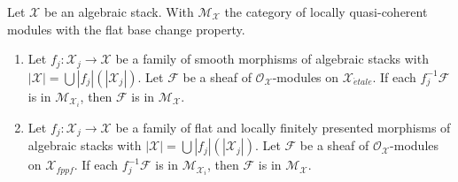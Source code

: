 \begin{lemma}
\label{lemma-check-lqc-fbc-on-covering}
Let $\mathcal{X}$ be an algebraic stack. With $\mathcal{M}_\mathcal{X}$
the category of locally quasi-coherent modules with the flat base change
property.
\begin{enumerate}
\item Let $f_j : \mathcal{X}_j \to \mathcal{X}$ be a family of smooth
morphisms of algebraic stacks with
$|\mathcal{X}| =\bigcup |f_j|(|\mathcal{X}_j|)$.
Let $\mathcal{F}$ be a sheaf of $\mathcal{O}_\mathcal{X}$-modules
on $\mathcal{X}_{\acute{e}tale}$. If each $f_j^{-1}\mathcal{F}$
is in $\mathcal{M}_{\mathcal{X}_i}$, then $\mathcal{F}$ is in
$\mathcal{M}_\mathcal{X}$.
\item  Let $f_j : \mathcal{X}_j \to \mathcal{X}$ be a family of flat
and locally finitely presented morphisms of algebraic stacks with
$|\mathcal{X}| =\bigcup |f_j|(|\mathcal{X}_j|)$.
Let $\mathcal{F}$ be a sheaf of $\mathcal{O}_\mathcal{X}$-modules
on $\mathcal{X}_{fppf}$. If each $f_j^{-1}\mathcal{F}$
is in $\mathcal{M}_{\mathcal{X}_i}$, then $\mathcal{F}$ is in
$\mathcal{M}_\mathcal{X}$.
\end{enumerate}
\end{lemma}

